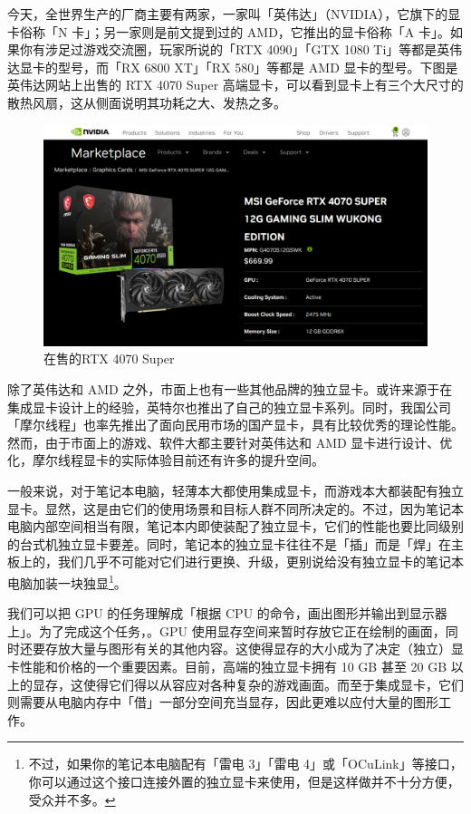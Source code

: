 今天，全世界生产的厂商主要有两家，一家叫「英伟达」（NVIDIA），它旗下的显卡俗称「N 卡」；另一家则是前文提到过的 AMD，它推出的显卡俗称「A 卡」。如果你有涉足过游戏交流圈，玩家所说的「RTX 4090」「GTX 1080 Ti」等都是英伟达显卡的型号，而「RX 6800 XT」「RX 580」等都是 AMD 显卡的型号。下图是英伟达网站上出售的 RTX 4070 Super 高端显卡，可以看到显卡上有三个大尺寸的散热风扇，这从侧面说明其功耗之大、发热之多。

\begin{figure}[htb!]
  \centering
  \includegraphics[width=.6\textwidth]{assets/basic/4070_storepage.png}
  \caption{在售的RTX 4070 Super}
  \label{fig:4070_storepage}
\end{figure}

\begin{note}
  除了英伟达和 AMD 之外，市面上也有一些其他品牌的独立显卡。或许来源于在集成显卡设计上的经验，英特尔也推出了自己的独立显卡系列。同时，我国公司「摩尔线程」也率先推出了面向民用市场的国产显卡，具有比较优秀的理论性能。然而，由于市面上的游戏、软件大都主要针对英伟达和 AMD 显卡进行设计、优化，摩尔线程显卡的实际体验目前还有许多的提升空间。
\end{note}

一般来说，对于笔记本电脑，轻薄本大都使用集成显卡，而游戏本大都装配有独立显卡。显然，这是由它们的使用场景和目标人群不同所决定的。不过，因为笔记本电脑内部空间相当有限，笔记本内即使装配了独立显卡，它们的性能也要比同级别的台式机独立显卡要差。同时，笔记本的独立显卡往往不是「插」而是「焊」在主板上的，我们几乎不可能对它们进行更换、升级，更别说给没有独立显卡的笔记本电脑加装一块独显\footnote{不过，如果你的笔记本电脑配有「雷电 3」「雷电 4」或「OCuLink」等接口，你可以通过这个接口连接外置的独立显卡来使用，但是这样做并不十分方便，受众并不多。}。

我们可以把 GPU 的任务理解成「根据 CPU 的命令，画出图形并输出到显示器上」。为了完成这个任务，。GPU 使用显存空间来暂时存放它正在绘制的画面，同时还要存放大量与图形有关的其他内容。这使得显存的大小成为了决定（独立）显卡性能和价格的一个重要因素。目前，高端的独立显卡拥有 10 GB 甚至 20 GB 以上的显存，这使得它们得以从容应对各种复杂的游戏画面。而至于集成显卡，它们则需要从电脑内存中「借」一部分空间充当显存，因此更难以应付大量的图形工作。

